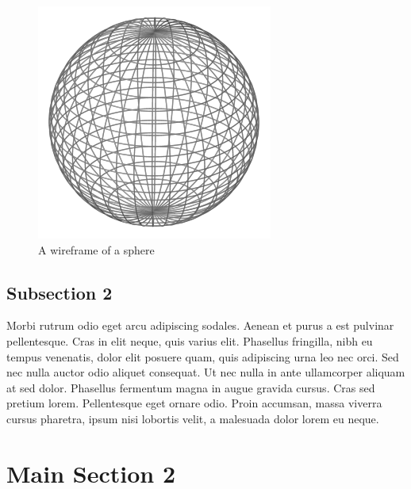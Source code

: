 
\begin{figure}[htbp]
\centering
\includegraphics[trim=0.1cm 0.3cm 0.5cm 0.5cm, clip=true, totalheight=0.5\textheight]{Figures/Sphere.png}
\caption[A wireframe of a sphere]{A wireframe of a sphere}
\label{Sphere}
\end{figure}



\subsection{Subsection 2}
Morbi rutrum odio eget arcu adipiscing sodales. Aenean et purus a est pulvinar pellentesque. Cras in elit neque, quis varius elit. Phasellus fringilla, nibh eu tempus venenatis, dolor elit posuere quam, quis adipiscing urna leo nec orci. Sed nec nulla auctor odio aliquet consequat. Ut nec nulla in ante ullamcorper aliquam at sed dolor. Phasellus fermentum magna in augue gravida cursus. Cras sed pretium lorem. Pellentesque eget ornare odio. Proin accumsan, massa viverra cursus pharetra, ipsum nisi lobortis velit, a malesuada dolor lorem eu neque.


\section{Main Section 2}

